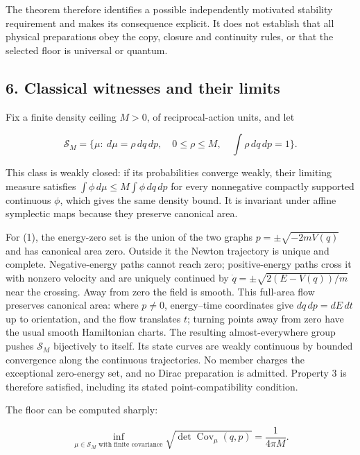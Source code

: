 \documentclass[11pt,a4paper]{article}
\begin{document}
The theorem therefore identifies a possible independently motivated
stability requirement and makes its consequence explicit. It does not
establish that all physical preparations obey the copy, closure and
continuity rules, or that the selected floor is universal or quantum.

\hypertarget{classical-witnesses-and-their-limits}{%
\subsection{6. Classical witnesses and their
limits}\label{classical-witnesses-and-their-limits}}

Fix a finite density ceiling \(M>0\), of reciprocal-action units, and
let

\[
 \mathcal S_M=\{\mu:\ d\mu=\rho\,dq\,dp,\quad 0\le\rho\le M,
                                 \quad\int\rho\,dq\,dp=1\}.
 \tag{12}
\]

This class is weakly closed: if its probabilities converge weakly, their
limiting measure satisfies \(\int\phi\,d\mu\le M\int\phi\,dq\,dp\) for
every nonnegative compactly supported continuous \(\phi\), which gives
the same density bound. It is invariant under affine symplectic maps
because they preserve canonical area.

For (1), the energy-zero set is the union of the two graphs
\(p=\pm\sqrt{-2mV(q)}\) and has canonical area zero. Outside it the
Newton trajectory is unique and complete. Negative-energy paths cannot
reach zero; positive-energy paths cross it with nonzero velocity and are
uniquely continued by \(\dot q=\pm\sqrt{2(E-V(q))/m}\) near the
crossing. Away from zero the field is smooth. This full-area flow
preserves canonical area: where \(p\ne0\), energy--time coordinates give
\(dq\,dp=dE\,dt\) up to orientation, and the flow translates \(t\);
turning points away from zero have the usual smooth Hamiltonian charts.
The resulting almost-everywhere group pushes \(\mathcal S_M\)
bijectively to itself. Its state curves are weakly continuous by bounded
convergence along the continuous trajectories. No member charges the
exceptional zero-energy set, and no Dirac preparation is admitted.
Property 3 is therefore satisfied, including its stated
point-compatibility condition.

The floor can be computed sharply:

\[
 \inf_{\mu\in\mathcal S_M\text{ with finite covariance}}
             \sqrt{\det\operatorname{Cov}_\mu(q,p)}
       =\frac{1}{4\pi M}.
 \tag{13}
\]
\end{document}

